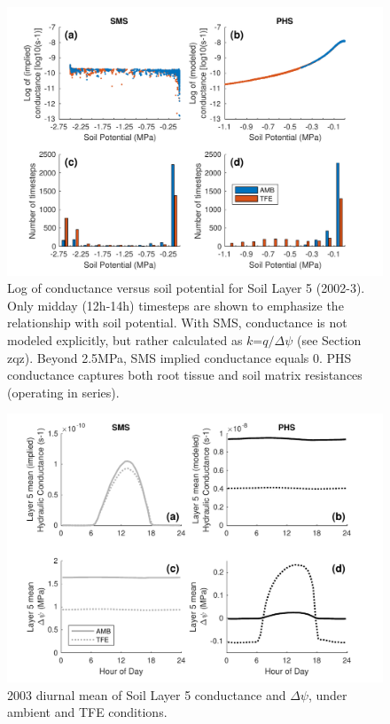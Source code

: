 \documentclass[draft,linenumbers]{agujournal}
\begin{document}
  
  \begin{figure}[h]
     \centering
     \includegraphics[width=30pc]{../figs3/suppcond.pdf}
     \caption{Log of conductance versus soil potential for Soil Layer 5 (2002-3).
     Only midday (12h-14h) timesteps are shown to emphasize the relationship with soil potential.
     With SMS, conductance is not modeled explicitly, but rather calculated as $k$=$q/\Delta\psi$ (see Section zqz). 
     Beyond 2.5MPa, SMS implied conductance equals 0.
     PHS conductance captures both root tissue and soil matrix resistances (operating in series).}
     \label{supp:cond}
  \end{figure}
  \clearpage

\clearpage   
  \begin{figure}[h]
     \centering
     \includegraphics[width=30pc]{../figs3/k.pdf}
     \caption{2003 diurnal mean of Soil Layer 5 conductance and $\Delta\psi$, under ambient and TFE conditions. 
     }
     \label{supp:cond2}
  \end{figure}
  
\end{document}
